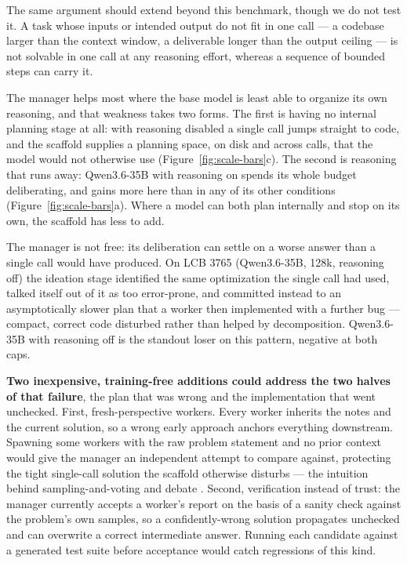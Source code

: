 \documentclass{article}
\begin{document}
The same argument should extend beyond this benchmark, though we do not test it. A task whose
inputs or intended output do not fit in one call --- a codebase larger than the context window,
a deliverable longer than the output ceiling --- is not solvable in one call at any reasoning
effort, whereas a sequence of bounded steps can carry it.

The manager helps most where the base model is least able to organize its own reasoning, and
that weakness takes two forms. The first is having no internal planning stage at all: with
reasoning disabled a single call jumps straight to code, and the scaffold supplies a planning
space, on disk and across calls, that the model would not otherwise use
(Figure~\ref{fig:scale-bars}c). The second is reasoning that runs away: Qwen3.6-35B with
reasoning on spends its whole budget deliberating, and gains more here than in any of its other
conditions (Figure~\ref{fig:scale-bars}a). Where a model can both plan internally and stop on
its own, the scaffold has less to add.

The manager is not free: its deliberation can settle on a worse answer than a single call would
have produced. On LCB 3765 (Qwen3.6-35B, 128k, reasoning off) the ideation stage identified the
same optimization the single call had used, talked itself out of it as too error-prone, and
committed instead to an asymptotically slower plan that a worker then implemented with a further
bug --- compact, correct code disturbed rather than helped by decomposition. Qwen3.6-35B with
reasoning off is the standout loser on this pattern, negative at both caps.

\textbf{Two inexpensive, training-free additions could address the two halves of that failure},
the plan that was wrong and the implementation that went unchecked. First,
fresh-perspective workers. Every worker inherits the notes and the current solution, so a
wrong early approach anchors everything downstream. Spawning some workers with the raw problem
statement and no prior context would give the manager an independent attempt to compare against,
protecting the tight single-call solution the scaffold otherwise disturbs --- the intuition
behind sampling-and-voting and debate \citep{li2024,du2023}. Second, verification instead
of trust: the manager currently accepts a worker's report on the basis of a sanity check against
the problem's own samples, so a confidently-wrong solution propagates unchecked and can overwrite
a correct intermediate answer. Running each candidate against a generated test suite before
acceptance would catch regressions of this kind.
\end{document}
